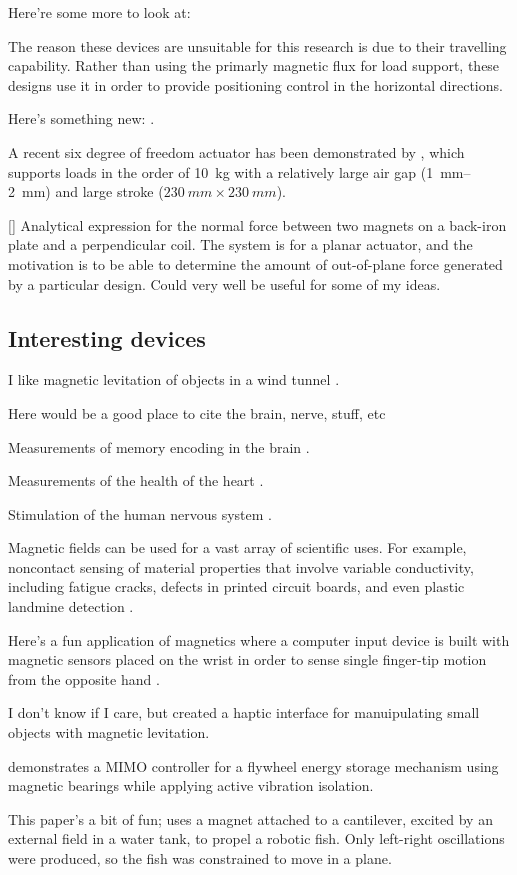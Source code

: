 Here're some more to look at: \textcite{boeij2008,zhang2008a}

The reason these devices are unsuitable for this research is due to their
travelling capability.
Rather than using the primarly magnetic flux for load
support, these designs use it in order to provide positioning control in the
horizontal directions.

Here's something new: \textcite{shameli2008}.

A recent six degree of freedom actuator has been demonstrated
by \textcite{jansen2008}, which supports loads in the order of
\SI{10}{kg} with a relatively large air gap (\SI{1}{mm}--\SI{2}{mm}) 
and large stroke ($\SI{230}{mm}\times\SI{230}{mm}$).

[\textcite{dasilveira2005}] Analytical expression for the normal force
between two magnets on a back-iron plate and a perpendicular coil.
The system
is for a planar actuator, and the motivation is to be able to determine the
amount of out-of-plane force generated by a particular design.
Could very well
be useful for some of my ideas.

\subsection{Interesting devices}


I like magnetic levitation of objects in a wind tunnel \cite{higuchi2008}.

Here would be a good place to cite the brain, nerve, stuff, etc
\parencite{lu2008,demachi2008}

Measurements of memory encoding in the brain \cite{gjini2005}.

Measurements of the health of the heart \cite{lim2009}.

Stimulation of the human nervous system \cite{darabant2009}.

Magnetic fields can be used for a vast array of scientific uses.
For example,
noncontact sensing of material properties that involve variable conductivity,
including fatigue cracks, defects in printed circuit boards, and even plastic
landmine detection \cite{mukhopadhyay2005}.

Here's a fun application of magnetics where a computer input device is built
with magnetic sensors placed on the wrist in order to sense single finger-tip
motion from the opposite hand \parencite{han2008}.

I don't know if I care, but \textcite{vanwest2007} created a haptic interface for manuipulating small objects with magnetic levitation.

\textcite{park2008} demonstrates a MIMO controller for a flywheel energy
storage mechanism using magnetic bearings while applying active vibration
isolation.

\textcite{tomie2005} This paper's a bit of fun; uses a magnet attached to a cantilever, excited by an external field in a water tank, to propel a robotic fish.
Only left-right oscillations were produced, so the fish was constrained to move in a plane.




